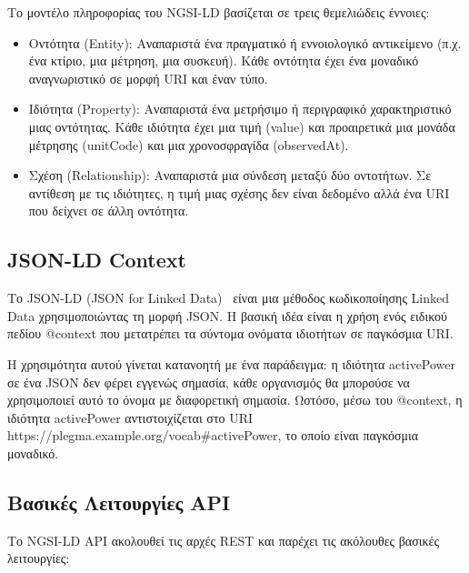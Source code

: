 Το μοντέλο πληροφορίας του \textlatin{NGSI-LD} βασίζεται σε τρεις
θεμελιώδεις έννοιες:

\begin{itemize}
    \item Οντότητα (\textlatin{Entity}): Αναπαριστά ένα
    πραγματικό ή εννοιολογικό αντικείμενο (π.χ. ένα κτίριο, μια
    μέτρηση, μια συσκευή). Κάθε οντότητα έχει ένα μοναδικό
    αναγνωριστικό σε μορφή \textlatin{URI} και έναν τύπο.
    \item Ιδιότητα (\textlatin{Property}): Αναπαριστά ένα
    μετρήσιμο ή περιγραφικό χαρακτηριστικό μιας οντότητας. Κάθε
    ιδιότητα έχει μια τιμή (\textlatin{value}) και προαιρετικά μια
    μονάδα μέτρησης (\textlatin{unitCode}) και μια χρονοσφραγίδα
    (\textlatin{observedAt}).
    \item Σχέση (\textlatin{Relationship}): Αναπαριστά μια
    σύνδεση μεταξύ δύο οντοτήτων. Σε αντίθεση με τις ιδιότητες, η
    τιμή μιας σχέσης δεν είναι δεδομένο αλλά ένα \textlatin{URI}
    που δείχνει σε άλλη οντότητα.
\end{itemize}

\subsection{\textlatin{JSON-LD Context}}
\label{subsec:json-ld-context}

Το \textlatin{JSON-LD} (\textlatin{JSON for Linked Data})~\cite{jsonld2020}
είναι μια μέθοδος κωδικοποίησης \textlatin{Linked Data} χρησιμοποιώντας
τη μορφή \textlatin{JSON}. Η βασική ιδέα είναι η χρήση ενός ειδικού
πεδίου \textlatin{@context} που μετατρέπει τα σύντομα ονόματα ιδιοτήτων
σε παγκόσμια \textlatin{URI}.

Η χρησιμότητα αυτού γίνεται κατανοητή με ένα παράδειγμα: η ιδιότητα
\textlatin{activePower} σε ένα \textlatin{JSON} δεν φέρει εγγενώς σημασία,
κάθε οργανισμός θα μπορούσε να χρησιμοποιεί αυτό το όνομα με
διαφορετική σημασία. Ωστόσο, μέσω του \textlatin{@context}, η ιδιότητα
\textlatin{activePower} αντιστοιχίζεται στο \textlatin{URI}
\textlatin{https://plegma.example.org/vocab\#activePower}, το οποίο
είναι παγκόσμια μοναδικό.

\subsection{Βασικές Λειτουργίες \textlatin{API}}
\label{subsec:ngsi-api}

Το \textlatin{NGSI-LD API} ακολουθεί τις αρχές \textlatin{REST} και
παρέχει τις ακόλουθες βασικές λειτουργίες:

